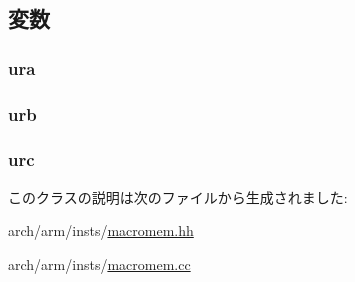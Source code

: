 \subsection{変数}
\hypertarget{classArmISA_1_1MicroSetPCCPSR_a605d05e28dce4515bfd33f74e709f29d}{
\subsubsection[{ura}]{ {\bf ura}}}
\label{classArmISA_1_1MicroSetPCCPSR_a605d05e28dce4515bfd33f74e709f29d}
\hypertarget{classArmISA_1_1MicroSetPCCPSR_aa5ea75563934f5379a9abef2877e781c}{
\subsubsection[{urb}]{ {\bf urb}}}
\label{classArmISA_1_1MicroSetPCCPSR_aa5ea75563934f5379a9abef2877e781c}
\hypertarget{classArmISA_1_1MicroSetPCCPSR_a86973ec62735a43f3925953a6b8afc99}{
\subsubsection[{urc}]{ {\bf urc}}}
\label{classArmISA_1_1MicroSetPCCPSR_a86973ec62735a43f3925953a6b8afc99}


このクラスの説明は次のファイルから生成されました:\begin{DoxyCompactItemize}
\item 
arch/arm/insts/\hyperlink{macromem_8hh}{macromem.hh}\item 
arch/arm/insts/\hyperlink{macromem_8cc}{macromem.cc}\end{DoxyCompactItemize}
